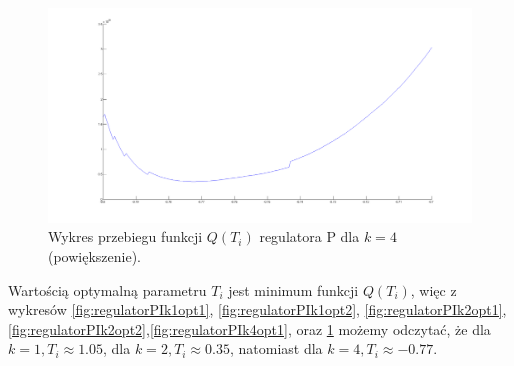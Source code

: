 \documentclass[a4paper,10pt]{article}
\begin{document}
\begin{figure}[!h]
    \centering
	\includegraphics[width=130mm]{CW2-regulatorPI-k4-opt2.png}
	\caption{Wykres przebiegu funkcji $Q(T_{i})$ regulatora P dla $k=4$ (powiększenie).}
    \label{fig:regulatorPIk4opt2}
\end{figure}
\newpage Wartością optymalną parametru $T_{i}$ jest minimum funkcji $Q(T_{i})$, więc z wykresów \ref{fig:regulatorPIk1opt1}, \ref{fig:regulatorPIk1opt2}, \ref{fig:regulatorPIk2opt1}, \ref{fig:regulatorPIk2opt2},\ref{fig:regulatorPIk4opt1}, oraz \ref{fig:regulatorPIk4opt2} możemy odczytać, że dla $k=1, T_{i} \approx 1.05$, dla $k=2, T_{i} \approx 0.35$, natomiast dla $k=4, T_{i} \approx -0.77$.
\end{document}
